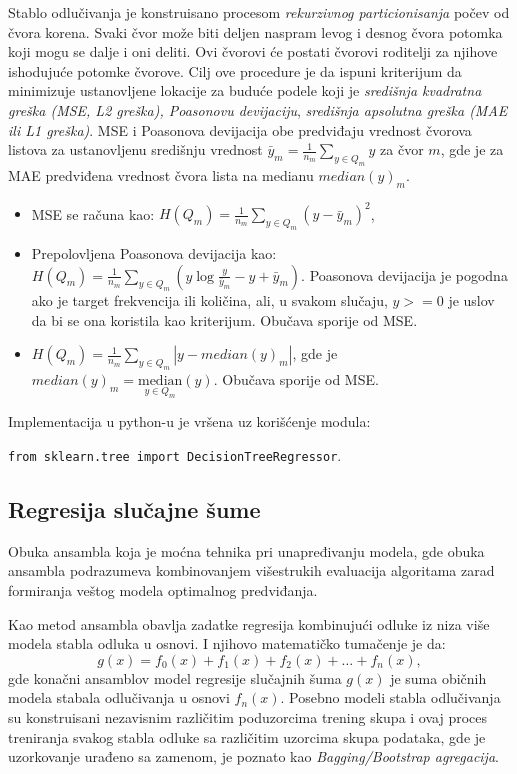\documentclass[fontsize=12bp, paper=a4]{scrarticle}
\begin{document}
Stablo odlučivanja je konstruisano procesom \textit{rekurzivnog particionisanja} počev od čvora korena. Svaki čvor može biti deljen naspram levog i desnog čvora potomka koji mogu se dalje i oni deliti. Ovi čvorovi će postati čvorovi roditelji za njihove ishodujuće potomke čvorove. Cilj ove procedure je da ispuni kriterijum da minimizuje ustanovljene lokacije za buduće podele koji je \textit{središnja kvadratna greška (MSE, L2 greška), Poasonovu devijaciju}, \textit{središnja apsolutna greška (MAE ili L1 greška)}.\cite{dTree} MSE i Poasonova devijacija obe predviđaju vrednost čvorova listova za ustanovljenu središnju vrednost $\bar{y}_m = \frac{1}{n_m}\sum_{y \in Q_m} y$ za čvor $m$, gde je za MAE predviđena vrednost čvora lista na medianu $median(y)_m$.

\begin{itemize}
    \item MSE se računa kao: $H(Q_m) = \frac{1}{n_m} \sum_{y \in Q_m} (y - \bar{y}_m)^2$,
    \item Prepolovljena Poasonova devijacija kao: $H(Q_m) = \frac{1}{n_m} \sum_{y \in Q_m} (y \log\frac{y}{\bar{y}_m} - y + \bar{y}_m)$.
    Poasonova devijacija je pogodna ako je target frekvencija ili količina, ali, u svakom slučaju, $y >= 0$ je uslov da bi se ona koristila kao kriterijum. Obučava sporije od MSE.
    \item $H(Q_m) = \frac{1}{n_m} \sum_{y \in Q_m} |y - median(y)_m|$, gde je $median(y)_m = \underset{y \in Q_m}{\mathrm{median}}(y)$. Obučava sporije od MSE.
\end{itemize}

Implementacija u python-u je vršena uz korišćenje modula:

\verb|from sklearn.tree import DecisionTreeRegressor|.

\newpage
\subsection{Regresija slučajne šume}
Obuka ansambla koja je moćna tehnika pri unapređivanju modela, gde obuka ansambla podrazumeva kombinovanjem višestrukih evaluacija algoritama zarad formiranja veštog modela optimalnog predviđanja.

Kao metod ansambla obavlja zadatke regresija kombinujući odluke iz niza više modela stabla odluka u osnovi. I njihovo matematičko tumačenje je da:
$$g(x) = f_0(x) + f_1(x) + f_2(x) + \dots + f_n(x),$$
gde konačni ansamblov model regresije slučajnih šuma $g(x)$ je suma običnih modela stabala odlučivanja u osnovi $f_n(x)$. Posebno modeli stabla odlučivanja su konstruisani nezavisnim različitim poduzorcima trening skupa i ovaj proces treniranja svakog stabla odluke sa različitim uzorcima skupa podataka, gde je uzorkovanje urađeno sa zamenom, je poznato kao \textit{Bagging/Bootstrap agregacija}.
\end{document}
